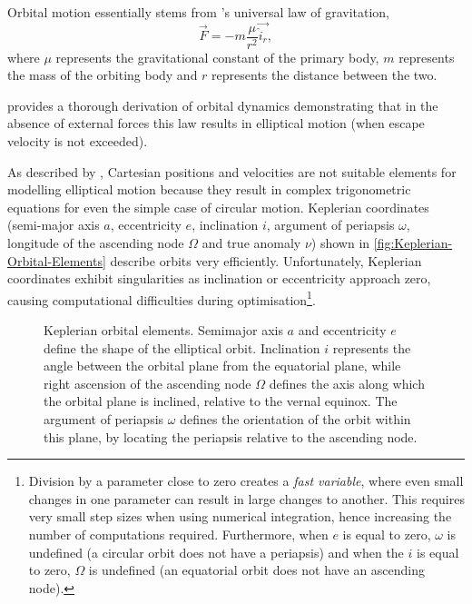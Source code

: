 Orbital motion essentially stems from \textcite{Newton1687}'s universal law of gravitation, 
\begin{equation}
\vec{F}=-m\frac{\mu}{r^{2}}\vec{\hat{i}_{r}} \label{eq:Fgravity},
\end{equation}
where $\mu$ represents the gravitational constant of the primary body, $m$  represents the mass of the orbiting body and $r$ represents the distance between the two.
 
\textcite{Kaplan1976} provides a thorough derivation of orbital dynamics demonstrating that in the absence of external forces this law results in elliptical motion (when escape velocity is not exceeded). %

As described by \textcite{Letterio_thesis}, Cartesian positions and velocities are not suitable elements for modelling elliptical motion because they result in complex trigonometric equations for even the simple case of circular motion. Keplerian coordinates (semi-major axis $a$, eccentricity $e$, inclination $i$, argument of periapsis $\omega$, longitude of the ascending node $\Omega$ and true anomaly $\nu$) shown in \autoref{fig:Keplerian-Orbital-Elements} describe orbits very efficiently. Unfortunately, Keplerian coordinates exhibit singularities as inclination or eccentricity approach zero, causing computational difficulties during optimisation\footnote{Division by a parameter close to zero creates a \emph{fast variable}, where even small changes in one parameter can result in large changes to another. This requires very small step sizes when using numerical integration, hence increasing the number of computations required. Furthermore, when $e$ is equal to zero, $\omega$ is undefined (a circular orbit does not have a periapsis) and when the $i$ is equal to zero, $\Omega$ is undefined (an equatorial orbit does not have an ascending node).}.

\begin{figure}[t]
\centering
\def\svgwidth{0.8\textwidth}

\caption{Keplerian orbital elements. Semimajor axis $a$ and eccentricity $e$ define the shape of the elliptical orbit. Inclination $i$ represents the angle between the orbital plane from the equatorial plane, while right ascension of the ascending node $\Omega$ defines the axis along which the orbital plane is inclined, relative to the vernal equinox. The argument of periapsis $\omega$ defines the orientation of the orbit within this plane, by locating the periapsis relative to the ascending node. %
} \label{fig:Keplerian-Orbital-Elements}
\end{figure}

